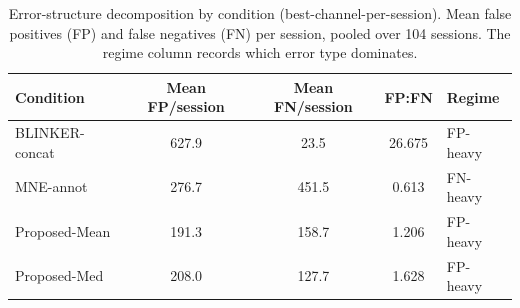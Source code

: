 \begin{table}[ht]
  \centering
  \caption{Error-structure decomposition by condition (best-channel-per-session). Mean false positives (FP) and false negatives (FN) per session, pooled over 104 sessions. The regime column records which error type dominates.}
  \label{tab:error-structure}
  \begin{tabular}{lcccl}
    \toprule
    Condition & Mean FP/session & Mean FN/session & FP:FN & Regime \\
    \midrule
    BLINKER-concat & 627.9 & 23.5 & 26.675 & FP-heavy \\
    MNE-annot & 276.7 & 451.5 & 0.613 & FN-heavy \\
    Proposed-Mean & 191.3 & 158.7 & 1.206 & FP-heavy \\
    Proposed-Med & 208.0 & 127.7 & 1.628 & FP-heavy \\
    \bottomrule
  \end{tabular}
\end{table}
